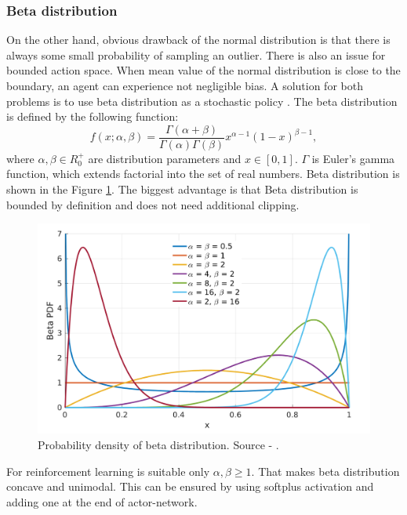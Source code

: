 \subsubsection{Beta distribution}
On the other hand, obvious drawback of the normal distribution is that there is always some small probability of sampling an outlier. There is also an issue for bounded action space. When mean value of the normal distribution is close to the boundary, an agent can experience not negligible bias. A solution for both problems is to use beta distribution as a stochastic policy \cite{chou17}. The beta distribution is defined by the following function:
\begin{equation}
f(x;\alpha, \beta) = \frac{\Gamma(\alpha + \beta)}{\Gamma(\alpha)\Gamma(\beta)}x^{\alpha-1}(1-x)^{\beta-1},
\end{equation}
where $\alpha,\beta \in R^+_0$ are distribution parameters and $x \in [0, 1]$. $\Gamma$ is Euler's gamma function, which extends factorial into the set of real numbers. Beta distribution is shown in the Figure \ref{fig:beta}. The biggest advantage is that Beta distribution is bounded by definition and does not need additional clipping.

\begin{figure}[H]
\centering
\includegraphics[scale=0.2]{fig/beta.png}
\caption[Probability density of beta distribution]{Probability density of beta distribution. Source - \cite{chou17}.}
\label{fig:beta}
\end{figure}

For reinforcement learning is suitable only $\alpha, \beta \geq 1$. That makes beta distribution concave and unimodal. This can be ensured by using softplus activation and adding one at the end of actor-network.

